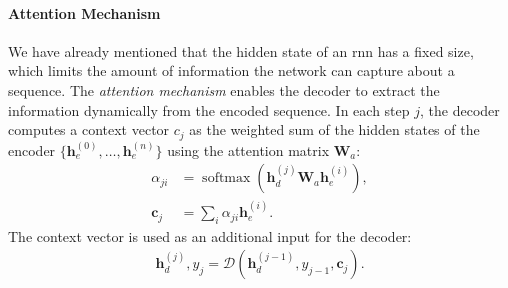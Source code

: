 {\paragraph{Attention Mechanism} We have already mentioned that the hidden state of an \ac{rnn} has a fixed size, which limits the amount of information the network can capture about a sequence. The \emph{attention mechanism} \cite{bahdanau2015neural} enables the decoder to extract the information dynamically from the encoded sequence. In each step $j$, the decoder computes a context vector $c_j$ as the weighted sum of the hidden states of the encoder $\{\mathbf{h}_e^{(0)}, \ldots, \mathbf{h}_e^{(n)}\}$ using the attention matrix $\mathbf{W}_a$:
\begin{align}
    \alpha_{ji}  & = \operatorname{softmax}(\mathbf{h}_d^{(j)}\mathbf{W}_a \mathbf{h}_e^{(i)}), \\
    \mathbf{c}_j & = \sum_i \alpha_{ji} \mathbf{h}_e^{(i)}.
\end{align}
The context vector is used as an additional input for the decoder:
\begin{align}
    \mathbf{h}_d^{(j)}, y_j = \mathcal{D}(\mathbf{h}_d^{(j-1)}, y_{j-1}, \mathbf{c}_j).
\end{align}


}
